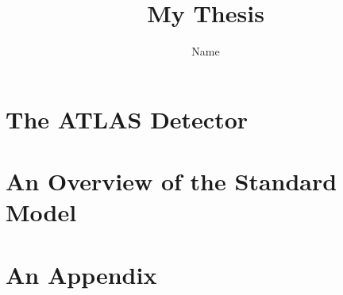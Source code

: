 \documentclass[thesis,openany]{./tex/thesis-umich}
\title{My Thesis}
\author{Name}
\begin{document}

\chapter{The ATLAS Detector} \label{chap:detector_chapter}
	 

\chapter{An Overview of the Standard Model} \label{chap:theory_chapter}
	 



\appendix

\chapter{An Appendix} \label{app:example_appendix}
	


 


\end{document}
